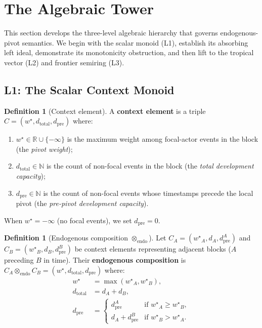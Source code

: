 \documentclass[11pt]{article}
\theoremstyle{plain}
\theoremstyle{definition}
\newtheorem{definition}[theorem]{Definition}
\theoremstyle{remark}
\newcommand{\R}{\mathbb{R}}
\newcommand{\N}{\mathbb{N}}
\newcommand{\opendo}{\otimes_{\mathrm{endo}}}
\newcommand{\wstar}{{w^{\star}}}
\newcommand{\dtotal}{{d_{\mathrm{total}}}}
\newcommand{\dpre}[1][]{d_{\mathrm{pre}#1}}
\begin{document}
\section{The Algebraic Tower}\label{sec:algebraic-tower}

This section develops the three-level algebraic hierarchy that governs
endogenous-pivot semantics.  We begin with the scalar monoid (L1),
establish its absorbing left ideal, demonstrate its monotonicity
obstruction, and then lift to the tropical vector (L2) and frontier
semiring (L3).

\subsection{L1: The Scalar Context Monoid}\label{subsec:l1}

\begin{definition}[Context element]\label{def:context-element}
A \textbf{context element} is a triple
$C = (\wstar, \dtotal, \dpre)$ where:
\begin{enumerate}[label=(\roman*),nosep]
  \item $\wstar \in \R \cup \{-\infty\}$ is the maximum weight among
    focal-actor events in the block (the \emph{pivot weight});
  \item $\dtotal \in \N$ is the count of non-focal events in the block
    (the \emph{total development capacity});
  \item $\dpre \in \N$ is the count of non-focal events whose
    timestamps precede the local pivot (the \emph{pre-pivot
    development capacity}).
\end{enumerate}
When $\wstar = -\infty$ (no focal events), we set $\dpre = 0$.
\end{definition}

\begin{definition}[Endogenous composition $\opendo$]
\label{def:endo-composition}
Let $C_A = (\wstar_A, d_A, \dpre^A)$ and $C_B = (\wstar_B, d_B, \dpre^B)$
be context elements representing adjacent blocks ($A$ preceding $B$ in
time).  Their \textbf{endogenous composition} is
$C_A \opendo C_B = (\wstar, \dtotal, \dpre)$ where:
\begin{align}
  \wstar &= \max(\wstar_A, \wstar_B), \label{eq:endo-w}\\
  \dtotal &= d_A + d_B, \label{eq:endo-d}\\
  \dpre &= \begin{cases}
    \dpre^A & \text{if } \wstar_A \ge \wstar_B,\\
    d_A + \dpre^B & \text{if } \wstar_B > \wstar_A.
  \end{cases} \label{eq:endo-p}
\end{align}
\end{definition}
\end{document}
